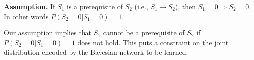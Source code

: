 \documentclass{edm_template}
\begin{document}
\textbf{Assumption.} If $S_1$ is a prerequisite of $S_2$ (i.e., $S_1\rightarrow S_2$), then $S_1=0\Rightarrow S_2=0 $. %
In other words $P(S_2=\text{0}|S_1=0)=1$.

Our assumption implies  that  $S_1$ cannot be a prerequisite of $S_2$ if $P(S_2=0|S_1=0)=1$ does not hold.
This puts a constraint on the joint distribution encoded by the Bayesian network to be learned.



%
\end{document}
